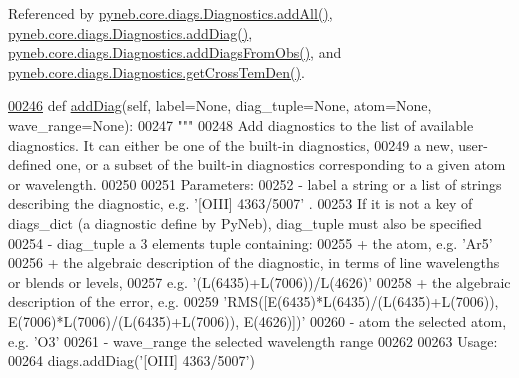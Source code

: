 Referenced by \hyperlink{diags_8py_source_l00327}{pyneb.\+core.\+diags.\+Diagnostics.\+add\+All()}, \hyperlink{diags_8py_source_l00246}{pyneb.\+core.\+diags.\+Diagnostics.\+add\+Diag()}, \hyperlink{diags_8py_source_l00353}{pyneb.\+core.\+diags.\+Diagnostics.\+add\+Diags\+From\+Obs()}, and \hyperlink{diags_8py_source_l00554}{pyneb.\+core.\+diags.\+Diagnostics.\+get\+Cross\+Tem\+Den()}.


\begin{DoxyCode}
\hypertarget{classpyneb_1_1core_1_1diags_1_1_diagnostics_l00246}{}\hyperlink{classpyneb_1_1core_1_1diags_1_1_diagnostics_a508fa9c5a2216f9eb4128338c33a6f75}{00246}     \textcolor{keyword}{def }\hyperlink{classpyneb_1_1core_1_1diags_1_1_diagnostics_a508fa9c5a2216f9eb4128338c33a6f75}{addDiag}(self, label=None, diag\_tuple=None, atom=None, wave\_range=None):
00247         \textcolor{stringliteral}{"""}
00248 \textcolor{stringliteral}{        Add diagnostics to the list of available diagnostics. It can either be one of the built-in
       diagnostics,}
00249 \textcolor{stringliteral}{        a new, user-defined one, or a subset of the built-in diagnostics corresponding to a given atom or
       wavelength.}
00250 \textcolor{stringliteral}{        }
00251 \textcolor{stringliteral}{        Parameters:}
00252 \textcolor{stringliteral}{            - label        a string or a list of strings describing the diagnostic, e.g. '[OIII] 4363/5007'
      . }
00253 \textcolor{stringliteral}{                           If it is not a key of diags\_dict (a diagnostic define by PyNeb), diag\_tuple must
       also be specified}
00254 \textcolor{stringliteral}{            - diag\_tuple   a 3 elements tuple containing:}
00255 \textcolor{stringliteral}{                           + the atom, e.g. 'Ar5'}
00256 \textcolor{stringliteral}{                           + the algebraic description of the diagnostic, in terms of line wavelengths or
       blends or levels, }
00257 \textcolor{stringliteral}{                             e.g. '(L(6435)+L(7006))/L(4626)'}
00258 \textcolor{stringliteral}{                           + the algebraic description of the error, e.g. }
00259 \textcolor{stringliteral}{                             'RMS([E(6435)*L(6435)/(L(6435)+L(7006)), E(7006)*L(7006)/(L(6435)+L(7006)),
       E(4626)])'}
00260 \textcolor{stringliteral}{            - atom         the selected atom, e.g. 'O3'}
00261 \textcolor{stringliteral}{            - wave\_range   the selected wavelength range}
00262 \textcolor{stringliteral}{            }
00263 \textcolor{stringliteral}{        Usage:}
00264 \textcolor{stringliteral}{        diags.addDiag('[OIII] 4363/5007')}

\end{DoxyCode}
